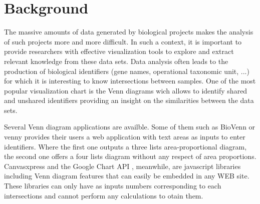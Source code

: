 \documentclass{bmcart}
\begin{document}



\section*{Background}

The massive amounts of data generated by biological projects makes the analysis of such projects more and 
more difficult. In such a context, it is important to provide researchers with effective visualization 
tools to explore and extract relevant knowledge from these data sets. Data analysis often leads to the 
production of biological identifiers (gene names, operational taxonomic unit, ...) for which it is 
interesting to know intersections between samples. One of the most popular visualization chart is the 
Venn diagrams \cite{Venn1880} wich allows to identify shared and unshared identifiers providing an insight 
on the similarities between the data sets.

Several Venn diagram applications are availble. Some of them such as BioVenn \cite{Hulsen2008} or venny 
\cite{venny} provides their users a web application with text areas as inputs to enter identifiers.
Where the first one outputs a three lists area-proportional diagram, the second one offers a four lists 
diagram without any respect of area proportions. Canvasxpress \cite{canvasxpress} and the Google Chart API
\cite{googleAPI}, meanwhile, are javascript libraries including Venn diagram features that can easily be 
embedded in any WEB site. These libraries can only have as inputs numbers corresponding to each intersections
and cannot perform any calculations to otain them.
\end{document}
